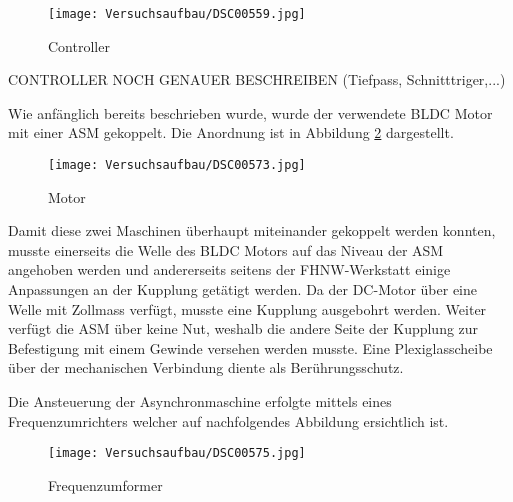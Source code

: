 \begin{figure}[H]
	\begin{center}
		\texttt{[image: Versuchsaufbau/DSC00559.jpg]}
		\caption[Controller]{Controller}
		\label{fig:Mikrocontroller}
	\end{center}
\end{figure}
CONTROLLER NOCH GENAUER BESCHREIBEN (Tiefpass, Schnitttriger,...)



Wie anfänglich bereits beschrieben wurde, wurde der verwendete BLDC Motor mit einer ASM gekoppelt. Die Anordnung ist in Abbildung \ref{fig:Motor} dargestellt.
\begin{figure}[H]
	\begin{center}
		\texttt{[image: Versuchsaufbau/DSC00573.jpg]}
		\caption[Motor]{Motor}
		\label{fig:Motor}
	\end{center}
\end{figure}
Damit diese zwei Maschinen überhaupt miteinander gekoppelt werden konnten, musste einerseits die Welle des BLDC Motors auf das Niveau der ASM angehoben werden und andererseits seitens der FHNW-Werkstatt einige Anpassungen an der Kupplung getätigt werden. Da der DC-Motor über eine Welle mit Zollmass verfügt, musste eine Kupplung ausgebohrt werden. Weiter verfügt die ASM über keine Nut, weshalb die andere Seite der Kupplung zur Befestigung mit einem Gewinde versehen werden musste. Eine Plexiglasscheibe über der mechanischen Verbindung diente als Berührungsschutz.

Die Ansteuerung der Asynchronmaschine erfolgte mittels eines Frequenzumrichters welcher auf nachfolgendes Abbildung ersichtlich ist.
\begin{figure}[H]
	\begin{center}
		\texttt{[image: Versuchsaufbau/DSC00575.jpg]}
		\caption[Frequenzumformer]{Frequenzumformer}
		\label{fig:Frequenzumformer}
	\end{center}
\end{figure}